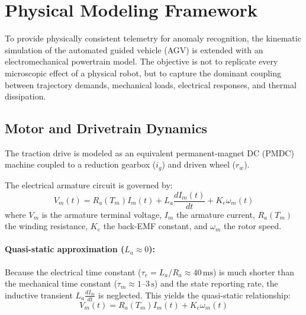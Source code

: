 
\section{Physical Modeling Framework}
\label{sec:physical_modeling}

To provide physically consistent telemetry for anomaly recognition, the kinematic simulation of the automated guided vehicle (AGV) is extended with an electromechanical powertrain model. The objective is not to replicate every microscopic effect of a physical robot, but to capture the dominant coupling between trajectory demands, mechanical loads, electrical responses, and thermal dissipation.

\subsection{Motor and Drivetrain Dynamics}

The traction drive is modeled as an equivalent permanent-magnet DC (PMDC) machine coupled to a reduction gearbox ($i_g$) and driven wheel ($r_w$).

The electrical armature circuit is governed by:
\begin{equation}
    V_m(t) = R_a(T_m) I_m(t) + L_a \frac{dI_m(t)}{dt} + K_e \omega_m(t)
    \label{eq:armature_base}
\end{equation}
where $V_m$ is the armature terminal voltage, $I_m$ the armature current, $R_a(T_m)$ the winding resistance, $K_e$ the back-EMF constant, and $\omega_m$ the rotor speed.

\paragraph{Quasi-static approximation ($L_a \approx 0$):}
Because the electrical time constant ($\tau_e = L_a / R_a \approx 40\,\mathrm{ms}$) is much shorter than the mechanical time constant ($\tau_m \approx 1\text{--}3\,\mathrm{s}$) and the state reporting rate, the inductive transient $L_a \frac{dI_m}{dt}$ is neglected. This yields the quasi-static relationship:
\begin{equation}
    V_m(t) = R_a(T_m) I_m(t) + K_e \omega_m(t)
\end{equation}

